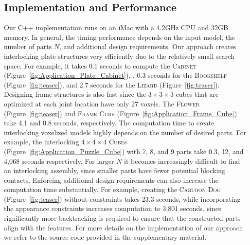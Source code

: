 \subsection{Implementation and Performance}
Our C++ implementation runs on an iMac with a 4.2GHz CPU and 32GB memory.
In general, the timing performance depends on the input model, the number of parts $N$, and additional design requirements.
Our approach creates interlocking plate structures very efficiently due to the relatively small search space.
For example, it takes 0.1 seconds to compute the \textsc{Cabinet} (Figure~\ref{fig:Application_Plate_Cabinet}), , 0.3 seconds for the \textsc{Bookshelf} (Figure~\ref{fig:teaser}), and  2.7 seconds for the \textsc{Lizard} (Figure~\ref{fig:teaser}).
Designing frame structures is also fast since the $3 \times 3 \times 3$ cubes that are optimized at each joint location have only 27 voxels.
The \textsc{Flower} (Figure~\ref{fig:teaser}) and \textsc{Frame Cube} (Figure~\ref{fig:Application_Frame_Cube}) take 4.1 and 0.8 seconds, respectively.
The computation time to create interlocking voxelized models highly depends on the number of desired parts. For example, the interlocking $4 \times 4 \times 4$ \textsc{Cube}s (Figure~\ref{fig:Application_Puzzle_Cube}) with 7, 8, and 9 parts take 0.3, 12, and 4,068 seconds respectively. For larger $N$ it becomes increasingly difficult to find an interlocking assembly, since smaller parts have fewer potential blocking contacts.
Enforcing additional design requirements can also increase the computation time substantially.
For example, creating the \textsc{Cartoon Dog} (Figure~\ref{fig:teaser}) without constraints takes 23.3 seconds, while incorporating the appearance constraints increases computation to 3,801 seconds, since significantly more backtracking is required to ensure that the constructed parts align with the features.
For more details on the implementation of our approach we refer to the source code provided in the supplementary material. 






